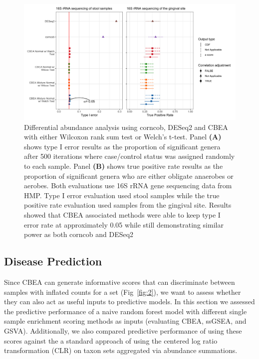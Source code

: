 \documentclass[10pt,letterpaper]{article}
\begin{document}
\begin{figure}[!h]
    \centering
    \includegraphics[width = \textwidth]{figures/data_diff_ab.png}
    \caption{Differential abundance analysis using corncob, DESeq2 and CBEA with either Wilcoxon rank sum test or Welch's t-test. Panel \textbf{(A)} shows type I error results as the proportion of significant genera after 500 iterations where case/control status was assigned randomly to each sample. Panel \textbf{(B)} shows true positive rate results as the proportion of significant genera who are either obligate anaerobes or aerobes. Both evaluations use 16S rRNA gene sequencing data from HMP. Type I error evaluation used stool samples while the true positive rate evaluation used samples from the gingival site. Results showed that CBEA associated methods were able to keep type I error rate at approximately 0.05 while still demonstrating similar power as both corncob and DESeq2} 
    \label{fig:5}
\end{figure}

\subsection*{Disease Prediction}   
Since CBEA can generate informative scores that can discriminate between samples with inflated counts for a set (Fig~\ref{fig:2}), we want to assess whether they can also act as useful inputs to predictive models. In this section we assessed the predictive performance of a naive random forest model \cite{breiman2001} with different single sample enrichment scoring methods as inputs (evaluating CBEA, ssGSEA, and GSVA). Additionally, we also compared predictive performance of using these scores against the a standard approach of using the centered log ratio transformation (CLR) on taxon sets aggregated via abundance summations.     
\end{document}
